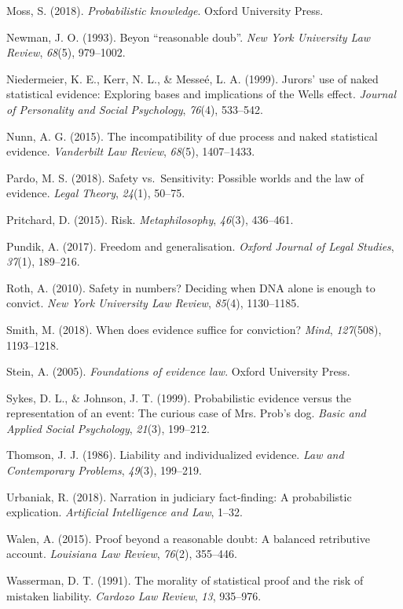 \documentclass[10pt,dvipsnames,enabledeprecatedfontcommands]{scrartcl}
\begin{document}
\hypertarget{ref-moss2018}{}
Moss, S. (2018). \emph{Probabilistic knowledge}. Oxford University
Press.

\hypertarget{ref-newman1993}{}
Newman, J. O. (1993). Beyon ``reasonable doub''. \emph{New York
University Law Review}, \emph{68}(5), 979--1002.

\hypertarget{ref-niedermeierEtAl1999}{}
Niedermeier, K. E., Kerr, N. L., \& Messeé, L. A. (1999). Jurors' use of
naked statistical evidence: Exploring bases and implications of the
Wells effect. \emph{Journal of Personality and Social Psychology},
\emph{76}(4), 533--542.

\hypertarget{ref-nunn2015}{}
Nunn, A. G. (2015). The incompatibility of due process and naked
statistical evidence. \emph{Vanderbilt Law Review}, \emph{68}(5),
1407--1433.

\hypertarget{ref-pardo2018}{}
Pardo, M. S. (2018). Safety vs.~Sensitivity: Possible worlds and the law
of evidence. \emph{Legal Theory}, \emph{24}(1), 50--75.

\hypertarget{ref-pritchard2015}{}
Pritchard, D. (2015). Risk. \emph{Metaphilosophy}, \emph{46}(3),
436--461.

\hypertarget{ref-pundik2017}{}
Pundik, A. (2017). Freedom and generalisation. \emph{Oxford Journal of
Legal Studies}, \emph{37}(1), 189--216.

\hypertarget{ref-Roth2010}{}
Roth, A. (2010). Safety in numbers? Deciding when DNA alone is enough to
convict. \emph{New York University Law Review}, \emph{85}(4),
1130--1185.

\hypertarget{ref-smith2017}{}
Smith, M. (2018). When does evidence suffice for conviction?
\emph{Mind}, \emph{127}(508), 1193--1218.

\hypertarget{ref-Stein05}{}
Stein, A. (2005). \emph{Foundations of evidence law}. Oxford University
Press.

\hypertarget{ref-sykes1999}{}
Sykes, D. L., \& Johnson, J. T. (1999). Probabilistic evidence versus
the representation of an event: The curious case of Mrs. Prob's dog.
\emph{Basic and Applied Social Psychology}, \emph{21}(3), 199--212.

\hypertarget{ref-Thomson86}{}
Thomson, J. J. (1986). Liability and individualized evidence. \emph{Law
and Contemporary Problems}, \emph{49}(3), 199--219.

\hypertarget{ref-urbaniak2018narration}{}
Urbaniak, R. (2018). Narration in judiciary fact-finding: A
probabilistic explication. \emph{Artificial Intelligence and Law},
1--32.

\hypertarget{ref-walen2015}{}
Walen, A. (2015). Proof beyond a reasonable doubt: A balanced
retributive account. \emph{Louisiana Law Review}, \emph{76}(2),
355--446.

\hypertarget{ref-Wasserman91}{}
Wasserman, D. T. (1991). The morality of statistical proof and the risk
of mistaken liability. \emph{Cardozo Law Review}, \emph{13}, 935--976.
\end{document}
